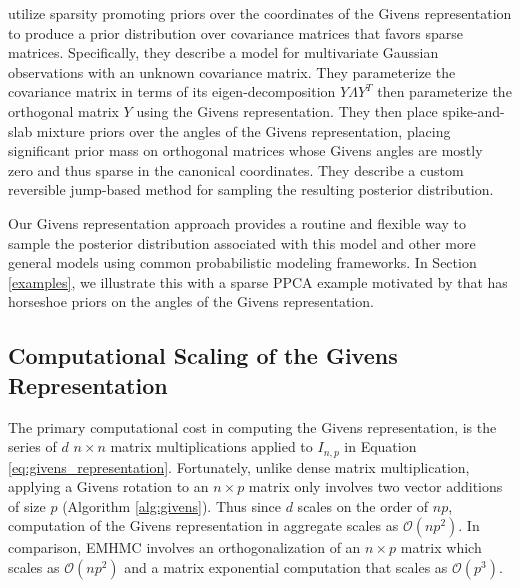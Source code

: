 \documentclass[ba]{imsart}
\numberwithin{equation}{section}
\theoremstyle{plain}
\begin{document}
\noindent \cite{cron2016models} utilize sparsity promoting priors over the coordinates of the Givens representation to produce a prior distribution over covariance matrices that favors sparse matrices. Specifically, they describe a model for multivariate Gaussian observations with an unknown covariance matrix. They parameterize the covariance matrix in terms of its eigen-decomposition $Y \Lambda Y^T$ then parameterize the orthogonal matrix $Y$ using the Givens representation. They then place spike-and-slab mixture priors over the angles of the Givens representation, placing significant prior mass on orthogonal matrices whose Givens angles are mostly zero and thus sparse in the canonical coordinates. They describe a custom reversible jump-based method for sampling the resulting posterior distribution.

Our Givens representation approach provides a routine and flexible way to sample the posterior distribution associated with this model and other more general models using common probabilistic modeling frameworks. In Section \ref{examples}, we illustrate this with a sparse PPCA example motivated by \cite{cron2016models} that has horseshoe priors on the angles of the Givens representation.


\subsection{Computational Scaling of the Givens Representation}\label{scaling}
The primary computational cost in computing the Givens representation, is the series of $d$ $n \times n$ matrix multiplications applied to $I_{n,p}$ in 
Equation \ref{eq:givens_representation}. Fortunately, unlike dense matrix multiplication, applying a Givens rotation to an $n \times p$ matrix only involves two vector additions of size $p$ (Algorithm \ref{alg:givens}). Thus since $d$ scales on the order of $np$, computation of the Givens representation in aggregate scales as $\mathcal{O}(np^2)$. In comparison, EMHMC involves an orthogonalization of an $n \times p$ matrix which scales as $\mathcal{O}(np^2)$ and a matrix exponential computation that scales as $\mathcal{O}(p^3)$.
\end{document}
